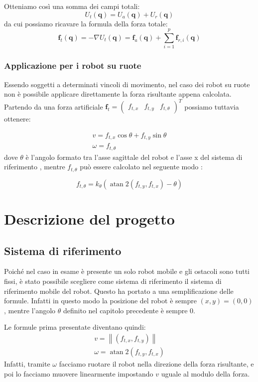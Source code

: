 \documentclass[Lau, binding=0.6cm, oneside]{sapthesis}
\begin{document}
Otteniamo così una somma dei campi totali:
$$
U_{t}(\boldsymbol{q})=U_{a}(\boldsymbol{q})+U_{r}(\boldsymbol{q})
$$
da cui possiamo ricavare la formula della forza totale:
$$
\boldsymbol{f}_{t}(\boldsymbol{q})=-\nabla U_{t}(\boldsymbol{q})=\boldsymbol{f}_{a}(\boldsymbol{q})+\sum_{i=1}^{p} \boldsymbol{f}_{r, i}(\boldsymbol{q})
$$
\cite{fonte2}

\subsection{Applicazione per i robot su ruote}
Essendo soggetti a determinati vincoli di movimento, nel caso dei robot su ruote non è possibile applicare direttamente la forza risultante appena calcolata.
Partendo da una forza artificiale $\boldsymbol{f}_{t}=\left(\begin{array}{lll}f_{t, x} & f_{t, y} & f_{t, \theta}\end{array}\right)^{T}$ possiamo tuttavia ottenere:

$$
\begin{array}{l}
v=f_{t, x} \cos \theta+f_{t, y} \sin \theta \\
\omega=f_{t, \theta}
\end{array}
$$
dove $\theta$ è l'angolo formato tra l'asse sagittale del robot e l'asse x del sistema di riferimento \cite{fonte4}, mentre $f_{t, \theta}$ può essere calcolato nel seguente modo \cite{fonte2}:

$$
f_{t, \theta}=k_{\theta}\left(\operatorname{atan} 2\left(f_{t, y}, f_{t, x}\right)-\theta\right)
$$

\chapter{Descrizione del progetto}
\section{Sistema di riferimento}
Poiché nel caso in esame è presente un solo robot mobile e gli ostacoli sono tutti fissi, è stato possibile scegliere come sistema di riferimento il sistema di riferimento mobile del robot.
Questo ha portato a una semplificazione delle formule.
Infatti in questo modo la posizione del robot è sempre $\left(x, y\right)=(0,0)$, mentre l'angolo $\theta$ definito nel capitolo precedente è sempre 0.

Le formule prima presentate diventano quindi:
$$
\begin{array}{l}
v=\left\|\left(f_{t, x}, f_{t, y}\right)\right\| \\
\omega=\operatorname{atan} 2\left(f_{t, y}, f_{t, x}\right)
\end{array}
$$
Infatti, tramite $\omega$ facciamo ruotare il robot nella direzione della forza risultante, e poi lo facciamo muovere linearmente impostando $v$ uguale al modulo della forza.
\end{document}
